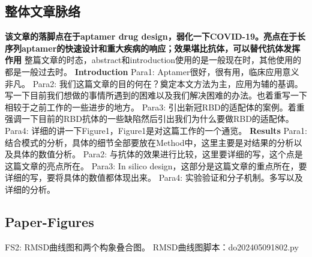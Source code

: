 \subsection{整体文章脉络}
\noindent\textbf{该文章的落脚点在于aptamer drug design，弱化一下COVID-19。亮点在于长序列aptamer的快速设计和重大疾病的响应；效果堪比抗体，可以替代抗体发挥作用}
\newline\noindent 整篇文章的时态，abstract和introduction使用的是一般现在时，其他使用的都是一般过去时。
\newline\textbf{Introduction}
\newline\indent Para1: Aptamer很好，很有用，临床应用意义非凡。
\newline\indent Para2: 我们这篇文章的目的何在？奠定本文方法为主，应用为辅的基调。写一下目前我们想做的事情所遇到的困难以及我们解决困难的办法。也着重写一下相较于之前工作的一些进步的地方。
\newline\indent Para3: 引出新冠RBD的适配体的案例。着重强调一下目前的RBD抗体的一些缺陷然后引出我们为什么要做RBD的适配体。
\newline\indent Para4: 详细的讲一下Figure1，Figure1是对这篇工作的一个通览。
\newline\noindent\textbf{Results}
\newline\indent Para1: 结合模式的分析，具体的细节全部要放在Method中，这里主要是对结果的分析以及具体的数值分析。
\newline\indent Para2: 与抗体的效果进行比较，这里要详细的写，这个点是这篇文章的亮点所在。
\newline\indent Para3: In silico design，这部分是这篇文章的重点所在，要详细的写，要将具体的数值都体现出来。
\newline\indent Para4: 实验验证和分子机制。多写以及详细的分析。
\subsection{Paper-Figures}
\noindent FS2: RMSD曲线图和两个构象叠合图。
RMSD曲线图脚本：do202405091802.py 
